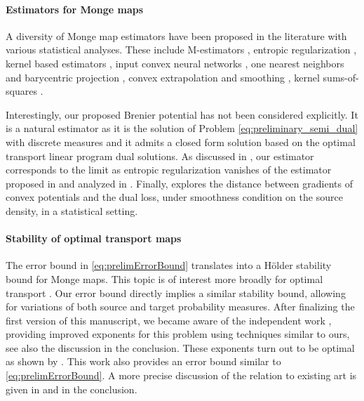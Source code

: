 \documentclass[11pt]{article}
\newcommand{\1}{\mathbbm{1}}
\numberwithin{equation}{section}
\begin{document}
\paragraph{Estimators for Monge maps} A diversity of Monge map estimators have been proposed in the literature with various statistical analyses. These include M-estimators \cite{hutter2021minimax,manole2024plugin,divol2025optimal,chewi2025estimation}, entropic regularization \cite{seguy2018large,pooladian2021entropic}, kernel based estimators \cite{perrot2016mapping,gunsilius2022convergence}, input convex neural networks \cite{makkuva2020optimal}, one nearest neighbors and barycentric projection \cite{manole2024plugin}, convex extrapolation and smoothing \cite{paty2020regularity,hallin2021distribution,de2021consistent}, kernel sums-of-squares \cite{vacher2021dimension,muzellec2021near}.  

Interestingly, our proposed Brenier potential has not been considered explicitly. It is a natural estimator as it is the solution of Problem \eqref{eq:preliminary_semi_dual} with discrete measures and it admits a closed form solution based on the optimal transport linear program dual solutions. As discussed in , our estimator corresponds to the limit as entropic regularization vanishes of the estimator proposed in \cite{seguy2018large} and analyzed in \cite{pooladian2021entropic,pooladian2023minimax}. Finally, \cite{vacher2022parameter} explores the distance between gradients of convex potentials and the dual loss, under smoothness condition on the source density, in a statistical setting.

\paragraph{Stability of optimal transport maps}
The error bound in \eqref{eq:prelimErrorBound} translates into a H\"older stability bound for Monge maps. This topic is of interest more broadly for optimal transport 
\cite{gigli2011holder,merigot2020quantitative,li2021quantitative,delalande2023quantitative,letrouit2024gluing}. Our error bound directly implies a similar stability bound, allowing for variations of both source and target probability measures. After finalizing the first version of this manuscript, we became aware of the independent work \cite{merigot2026sharp}, providing improved exponents for this problem using techniques similar to ours, see also the discussion in the conclusion. These exponents turn out to be optimal as shown by \cite{letrouit2025unstable}. This work also provides an error bound similar to \eqref{eq:prelimErrorBound}.
A more precise discussion of the relation to existing art is given in  and in the conclusion.
\end{document}
